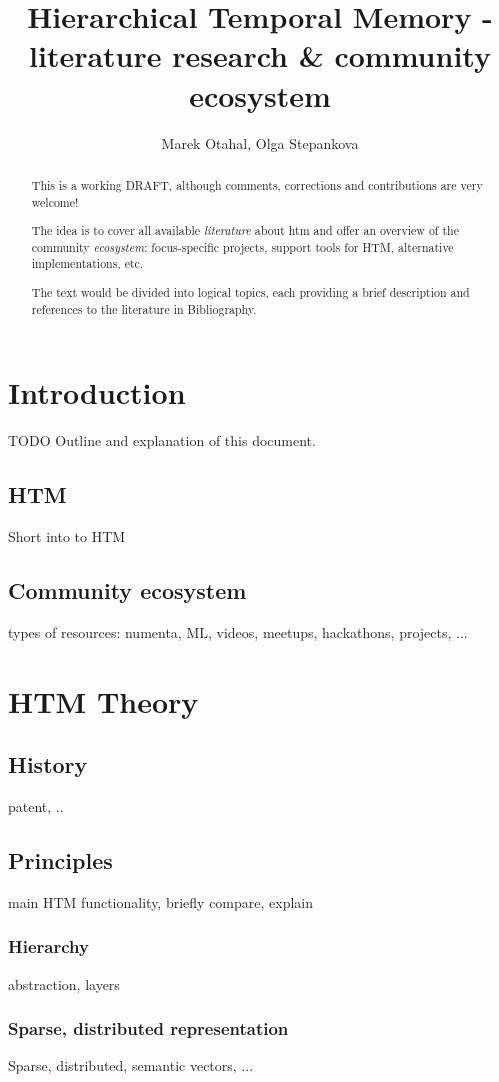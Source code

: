 \documentclass[a4,IEEEconf]{article}
\title{Hierarchical Temporal Memory - literature research \& community ecosystem}
\author{Marek Otahal, Olga Stepankova}
\begin{document}
\maketitle



\begin{abstract}
This is a working DRAFT, although comments, corrections and contributions are very welcome! 

The idea is to cover all available \textit{literature} about \gls{htm} and offer an overview of the community \textit{ecosystem}: focus-specific projects, support tools for HTM, alternative implementations, etc. 

The text would be divided into logical topics, each providing a brief description and references to the literature in Bibliography.
\end{abstract}

\tableofcontents
\printglossaries

\section{Introduction}
TODO Outline and explanation of this document.
\subsection{HTM}
Short into to HTM
\subsection{Community ecosystem}
types of resources: numenta, ML, videos, meetups, hackathons, projects, ...

\section{HTM Theory}
\subsection{History}
patent, ..
\subsection{Principles}
main HTM functionality, briefly compare, explain
\subsubsection{Hierarchy}
abstraction, layers
\subsubsection{Sparse, distributed representation}
Sparse, distributed, semantic vectors, ...
\end{document}
